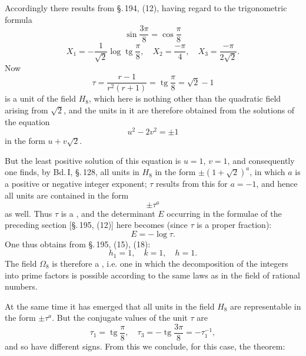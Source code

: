 
Accordingly there results from \S.\,194, (12), having regard to the trigonometric formula
\[
\sin\frac{3\pi}{8} = \cos\frac{\pi}{8}
\]
\[
X_1 = -\frac{1}{\sqrt{2}} \log \operatorname{tg}\frac{\pi}{8}, \quad X_2 = \frac{-\pi}{4}, \quad X_3 = \frac{-\pi}{2\sqrt{2}}.
\]
Now
\[
\tau = \frac{r-1}{r^2(r+1)} = \operatorname{tg}\frac{\pi}{8} = \sqrt{2} - 1
\]
is a unit of the field $H_8$, which here is nothing other than the quadratic field arising from $\sqrt{2}$, and the units in it are therefore obtained from the solutions of the  equation
\[
u^2 - 2v^2 = \pm 1
\]
in the form $u + v\sqrt{2}$.

But the least positive solution of this  equation is $u = 1$, $v = 1$, and consequently one finds, by Bd.\,I, \S.\,128, all units in $H_8$ in the form $\pm(1+\sqrt{2})^a$, in which $a$ is a positive or negative integer exponent; $\tau$ results from this for $a = -1$, and hence all units are contained in the form
\[
\pm \tau^a
\]
as well. Thus $\tau$ is a , and the determinant $E$ occurring in the formulae of the preceding section [\S.\,195, (12)] here becomes (since $\tau$ is a proper fraction):
\[
E = -\log \tau.
\]
One thus obtains from \S.\,195, (15), (18):
\[
h_1 = 1, \quad k = 1, \quad h = 1.
\]
The field $\Omega_8$ is therefore a , i.e. one in which the decomposition of the integers into prime factors is possible according to the same laws as in the field of rational numbers.

At the same time it has emerged that all units in the field $H_8$ are representable in the form $\pm \tau^a$. But the conjugate values of the unit $\tau$ are
\[
\tau_1 = \operatorname{tg}\frac{\pi}{8}, \quad \tau_3 = -\operatorname{tg}\frac{3\pi}{8} = -\tau_1^{-1},
\]
and so have different signs. From this we conclude, for this case, the theorem:
